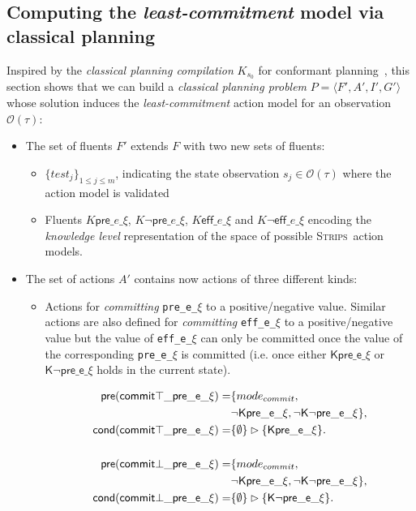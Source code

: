 \documentclass{article}
\newcommand{\tup}[1]{{\langle #1 \rangle}}
\newcommand{\pre}{\mathsf{pre}}     %
\newcommand{\eff}{\mathsf{eff}}     %
\newcommand{\cond}{\mathsf{cond}}   %
\newcommand{\strips}{\textsc{Strips}}
\begin{document}
\subsection{Computing the {\em least-commitment} model via classical planning}
Inspired by the {\em classical planning compilation} $K_{s_0}$ for conformant planning~\cite{palacios-conformant-JAIR09}, this section shows that we can build a {\em classical planning problem} $P=\tup{F',A',I',G'}$ whose solution induces the {\em least-commitment} action model for an observation $\mathcal{O}(\tau)$: 
\begin{itemize}
\item The set of fluents $F'$ extends $F$ with two new sets of fluents:
      \begin{itemize}
      \item $\{test_j\}_{1\leq j\leq m}$, indicating the state observation $s_j\in\mathcal{O}(\tau)$ where the action model is validated
      \item Fluents {\tt\small $K\pre\_e\_\xi$}, {\tt\small $K\neg\pre\_e\_\xi$}, {\tt\small $K\eff\_e\_\xi$} and {\tt\small $K\neg\eff\_e\_\xi$} encoding the {\em knowledge level} representation of the space of possible \strips\ action models.
      \end {itemize}
\item The set of actions $A'$ contains now actions of three different kinds:
\begin{itemize}
      \item Actions for {\em committing} {\tt\small pre\_e\_$\xi$} to a positive/negative value. Similar actions are also defined for {\em committing} {\tt\small eff\_e\_$\xi$} to a positive/negative value but the value of {\tt\small eff\_e\_$\xi$} can only be committed once the value of the corresponding {\tt\small pre\_e\_$\xi$} is committed (i.e. once either $\mathsf{K\pre\_e\_\xi}$ or $\mathsf{K\neg\pre\_e\_\xi}$ holds in the current state).
\begin{small}
\begin{align*}
\hspace*{7pt}\pre(\mathsf{commit\top\_pre\_e\_\xi})=&\{mode_{commit}, \\
&\mathsf{\neg K\pre\_e\_\xi}, \mathsf{\neg K\neg\pre\_e\_\xi}\},\\
\cond(\mathsf{commit\top\_pre\_e\_\xi})=&\{\emptyset\}\rhd\{\mathsf{K\pre\_e\_\xi}\}.\\\\
\hspace*{7pt}\pre(\mathsf{commit\bot\_pre\_e\_\xi})=&\{mode_{commit}, \\
&\mathsf{\neg K\pre\_e\_\xi},\mathsf{\neg K\neg\pre\_e\_\xi}\},\\
\cond(\mathsf{commit\bot\_pre\_e\_\xi})=&\{\emptyset\}\rhd\{\mathsf{K\neg\pre\_e\_\xi}\}.
\end{align*}
\end{small}


\end{itemize}
\end{itemize}
\end{document}
